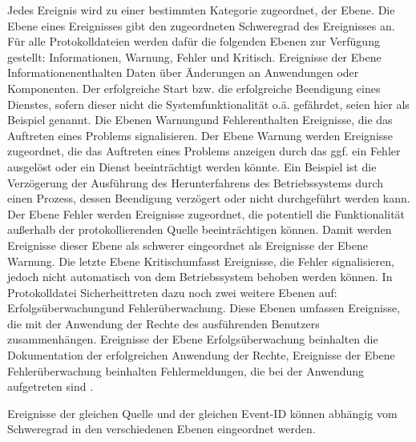 Jedes Ereignis wird zu einer bestimmten Kategorie zugeordnet, der Ebene. Die Ebene eines Ereignisses gibt den zugeordneten Schweregrad des Ereignisses an. Für alle Protokolldateien werden dafür die folgenden Ebenen zur Verfügung gestellt: Informationen, Warnung, Fehler und Kritisch. Ereignisse der Ebene \glqq Informationen\grqq  enthalten Daten über Änderungen an Anwendungen oder Komponenten. Der erfolgreiche Start bzw. die erfolgreiche Beendigung eines Dienstes, sofern dieser nicht die Systemfunktionalität o.ä. gefährdet, seien hier als Beispiel genannt. Die Ebenen \glqq Warnung\grqq  und \glqq Fehler\grqq  enthalten Ereignisse, die das Auftreten eines Problems signalisieren. Der Ebene Warnung werden Ereignisse zugeordnet, die das Auftreten eines Problems anzeigen durch das ggf. ein Fehler ausgelöst oder ein Dienst beeinträchtigt werden könnte. Ein Beispiel ist die Verzögerung der Ausführung des Herunterfahrens des Betriebssystems durch einen Prozess, dessen Beendigung verzögert oder nicht durchgeführt werden kann. Der Ebene Fehler werden Ereignisse zugeordnet, die potentiell die Funktionalität außerhalb der protokollierenden Quelle beeinträchtigen können. Damit werden Ereignisse dieser Ebene als schwerer eingeordnet als Ereignisse der Ebene Warnung. Die letzte Ebene \glqq Kritisch\grqq   umfasst Ereignisse, die Fehler signalisieren, jedoch nicht automatisch von dem Betriebssystem behoben werden können. 
In Protokolldatei \glqq Sicherheit\grqq  treten dazu noch zwei weitere Ebenen auf: \glqq Erfolgsüberwachung\grqq  und \glqq Fehlerüberwachung\grqq . Diese Ebenen umfassen Ereignisse, die mit der Anwendung der Rechte des ausführenden Benutzers zusammenhängen. Ereignisse der Ebene Erfolgsüberwachung beinhalten die Dokumentation der erfolgreichen Anwendung der Rechte, Ereignisse der Ebene Fehlerüberwachung beinhalten Fehlermeldungen, die bei der Anwendung aufgetreten sind \citep{MS1}.

Ereignisse der gleichen Quelle und der gleichen Event-ID können abhängig vom Schweregrad in den verschiedenen Ebenen eingeordnet werden.\\

